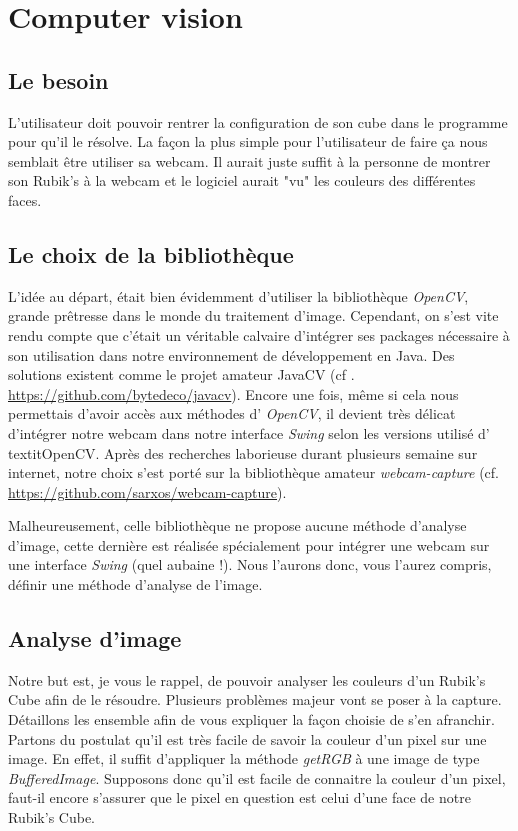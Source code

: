 \chapter{Computer vision}

\section{Le besoin}
L'utilisateur doit pouvoir rentrer la configuration de son cube dans le programme pour qu'il le résolve.
La façon la plus simple pour l'utilisateur de faire ça nous semblait être utiliser sa webcam.
Il aurait juste suffit à la personne de montrer son Rubik's à la webcam et le logiciel aurait "vu" les couleurs des différentes faces.

\section{Le choix de la bibliothèque}
L'idée au départ, était bien évidemment d'utiliser la bibliothèque \textit{OpenCV}, grande prêtresse dans le monde du traitement d'image.
Cependant, on s'est vite rendu compte que c'était un véritable calvaire d'intégrer ses packages nécessaire à son utilisation dans notre 
environnement de développement en Java. Des solutions existent comme le projet amateur JavaCV (cf . \url{https://github.com/bytedeco/javacv}).
Encore une fois, même si cela nous permettais d'avoir accès aux méthodes d' \textit{OpenCV}, il devient très délicat d'intégrer notre webcam
dans notre interface \textit{Swing} selon les versions utilisé d' textit{OpenCV}. Après des recherches laborieuse durant plusieurs semaine 
sur internet, notre choix s'est porté sur la bibliothèque amateur \textit{webcam-capture} (cf. \url{https://github.com/sarxos/webcam-capture}).

Malheureusement, celle bibliothèque ne propose aucune méthode d'analyse d'image, cette dernière est réalisée spécialement pour intégrer une webcam
sur une interface \textit{Swing} (quel aubaine !). Nous l'aurons donc, vous l'aurez compris, définir une méthode d'analyse de l'image.

\section{Analyse d'image}
Notre but est, je vous le rappel, de pouvoir analyser les couleurs d'un Rubik's Cube afin de le résoudre. Plusieurs problèmes majeur vont se poser à la capture.
Détaillons les ensemble afin de vous expliquer la façon choisie de s'en afranchir.
Partons du postulat qu'il est très facile de savoir la couleur d'un pixel sur une image.
En effet, il suffit d'appliquer la méthode \textit{getRGB} à une image de type \textit{BufferedImage}.
Supposons donc qu'il est facile de connaitre la couleur d'un pixel, faut-il encore s'assurer que le pixel en question est celui d'une face de notre Rubik's Cube.

